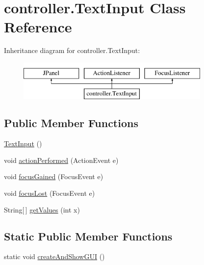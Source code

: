 \hypertarget{classcontroller_1_1_text_input}{\section{controller.\-Text\-Input Class Reference}
\label{classcontroller_1_1_text_input}
}
Inheritance diagram for controller.\-Text\-Input\-:\begin{figure}[H]
\begin{center}
\leavevmode
\includegraphics[height=2.000000cm]{classcontroller_1_1_text_input}
\end{center}
\end{figure}
\subsection*{Public Member Functions}
\begin{DoxyCompactItemize}
\item 
\hyperlink{classcontroller_1_1_text_input_a76a124852e34a64a21b5b74ce812ddaa}{Text\-Input} ()
\item 
void \hyperlink{classcontroller_1_1_text_input_adcac245938697e197f542f570cffd793}{action\-Performed} (Action\-Event e)
\item 
void \hyperlink{classcontroller_1_1_text_input_aacfb1f19223c451a9440dc561b17cf98}{focus\-Gained} (Focus\-Event e)
\item 
void \hyperlink{classcontroller_1_1_text_input_ad1ff76e878ea676f80232d5796f0c006}{focus\-Lost} (Focus\-Event e)
\item 
String\mbox{[}$\,$\mbox{]} \hyperlink{classcontroller_1_1_text_input_ab178b0020e8da80e7f355b8d80282e2a}{get\-Values} (int x)
\end{DoxyCompactItemize}
\subsection*{Static Public Member Functions}
\begin{DoxyCompactItemize}
\item 
static void \hyperlink{classcontroller_1_1_text_input_a5ae92539dc711f6d646808902a9a9762}{create\-And\-Show\-G\-U\-I} ()
\end{DoxyCompactItemize}
